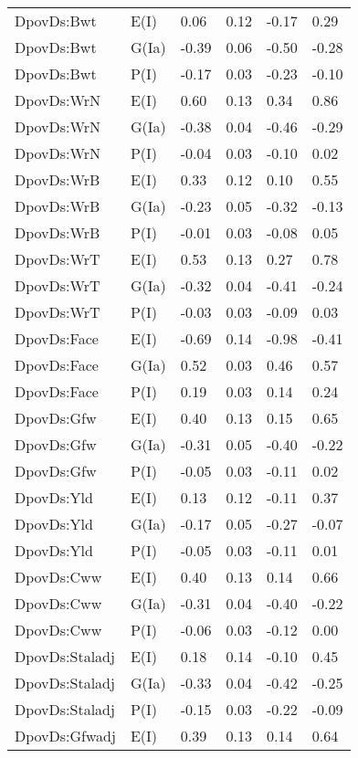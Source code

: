 \begin{center}
\begin{longtable}{|p{1.1in}|p{0.7in}|p{0.7in}|p{0.6in}|p{0.6in}|p{0.6in}|}
  DpovDs:Bwt & E(I) & 0.06 & 0.12 & -0.17 & 0.29 \\ 
  DpovDs:Bwt & G(Ia) & -0.39 & 0.06 & -0.50 & -0.28 \\ 
  DpovDs:Bwt & P(I) & -0.17 & 0.03 & -0.23 & -0.10 \\ 
  DpovDs:WrN & E(I) & 0.60 & 0.13 & 0.34 & 0.86 \\ 
  DpovDs:WrN & G(Ia) & -0.38 & 0.04 & -0.46 & -0.29 \\ 
  DpovDs:WrN & P(I) & -0.04 & 0.03 & -0.10 & 0.02 \\ 
  DpovDs:WrB & E(I) & 0.33 & 0.12 & 0.10 & 0.55 \\ 
  DpovDs:WrB & G(Ia) & -0.23 & 0.05 & -0.32 & -0.13 \\ 
  DpovDs:WrB & P(I) & -0.01 & 0.03 & -0.08 & 0.05 \\ 
  DpovDs:WrT & E(I) & 0.53 & 0.13 & 0.27 & 0.78 \\ 
  DpovDs:WrT & G(Ia) & -0.32 & 0.04 & -0.41 & -0.24 \\ 
  DpovDs:WrT & P(I) & -0.03 & 0.03 & -0.09 & 0.03 \\ 
  DpovDs:Face & E(I) & -0.69 & 0.14 & -0.98 & -0.41 \\ 
  DpovDs:Face & G(Ia) & 0.52 & 0.03 & 0.46 & 0.57 \\ 
  DpovDs:Face & P(I) & 0.19 & 0.03 & 0.14 & 0.24 \\ 
  DpovDs:Gfw & E(I) & 0.40 & 0.13 & 0.15 & 0.65 \\ 
  DpovDs:Gfw & G(Ia) & -0.31 & 0.05 & -0.40 & -0.22 \\ 
  DpovDs:Gfw & P(I) & -0.05 & 0.03 & -0.11 & 0.02 \\ 
  DpovDs:Yld & E(I) & 0.13 & 0.12 & -0.11 & 0.37 \\ 
  DpovDs:Yld & G(Ia) & -0.17 & 0.05 & -0.27 & -0.07 \\ 
  DpovDs:Yld & P(I) & -0.05 & 0.03 & -0.11 & 0.01 \\ 
  DpovDs:Cww & E(I) & 0.40 & 0.13 & 0.14 & 0.66 \\ 
  DpovDs:Cww & G(Ia) & -0.31 & 0.04 & -0.40 & -0.22 \\ 
  DpovDs:Cww & P(I) & -0.06 & 0.03 & -0.12 & 0.00 \\ 
  DpovDs:Staladj & E(I) & 0.18 & 0.14 & -0.10 & 0.45 \\ 
  DpovDs:Staladj & G(Ia) & -0.33 & 0.04 & -0.42 & -0.25 \\ 
  DpovDs:Staladj & P(I) & -0.15 & 0.03 & -0.22 & -0.09 \\ 
  DpovDs:Gfwadj & E(I) & 0.39 & 0.13 & 0.14 & 0.64 \\ 

\end{longtable}
\end{center}
